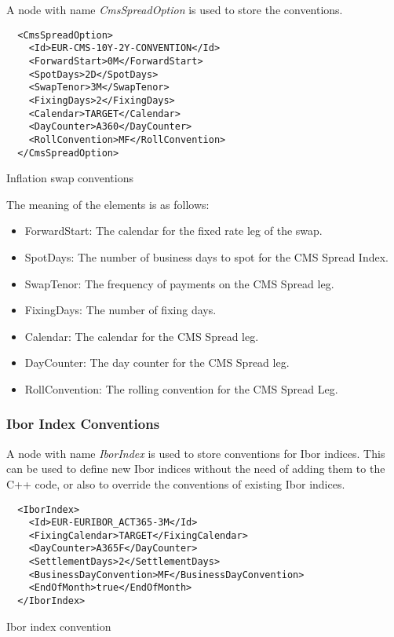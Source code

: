 A node with name \emph{CmsSpreadOption} is used to store the conventions.

\begin{listing}[H]
\begin{verbatim}
  <CmsSpreadOption>
    <Id>EUR-CMS-10Y-2Y-CONVENTION</Id>
    <ForwardStart>0M</ForwardStart>
    <SpotDays>2D</SpotDays>
    <SwapTenor>3M</SwapTenor>
    <FixingDays>2</FixingDays>
    <Calendar>TARGET</Calendar>
    <DayCounter>A360</DayCounter>
    <RollConvention>MF</RollConvention>
  </CmsSpreadOption>
\end{verbatim}
\caption{Inflation swap conventions}
\label{lst:cms_spread_option_conventions}
\end{listing}

The meaning of the elements is as follows:

\begin{itemize}
\item ForwardStart: The calendar for the fixed rate leg of the swap.
\item SpotDays: The number of business days to spot for the CMS Spread Index.
\item SwapTenor: The frequency of payments on the CMS Spread leg.
\item FixingDays: The number of fixing days.
\item Calendar: The calendar for the CMS Spread leg.
\item DayCounter: The day counter for the CMS Spread leg.
\item RollConvention: The rolling convention for the CMS Spread Leg.
\end{itemize}

\subsubsection{Ibor Index Conventions}

A node with name \emph{IborIndex} is used to store conventions for Ibor indices. This can be used to define new Ibor
indices without the need of adding them to the C++ code, or also to override the conventions of existing Ibor indices.

\begin{listing}[H]
\begin{verbatim}
  <IborIndex>
    <Id>EUR-EURIBOR_ACT365-3M</Id>
    <FixingCalendar>TARGET</FixingCalendar>
    <DayCounter>A365F</DayCounter>
    <SettlementDays>2</SettlementDays>
    <BusinessDayConvention>MF</BusinessDayConvention>
    <EndOfMonth>true</EndOfMonth>
  </IborIndex>
\end{verbatim}
\caption{Ibor index convention}
\label{lst:ibor_index_conventions}
\end{listing}

